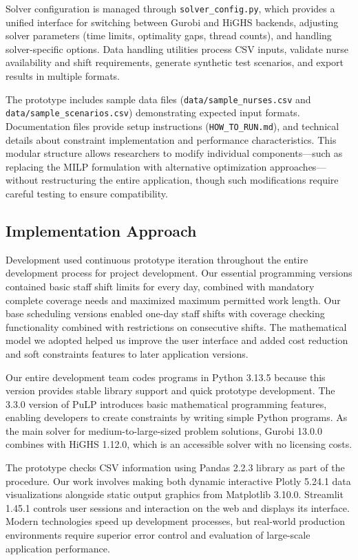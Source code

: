 \documentclass[1pt,a4paper]{article}
\begin{document}
Solver configuration is managed through \texttt{solver\_config.py}, which provides a unified interface for switching between Gurobi and HiGHS backends, adjusting solver parameters (time limits, optimality gaps, thread counts), and handling solver-specific options. Data handling utilities process CSV inputs, validate nurse availability and shift requirements, generate synthetic test scenarios, and export results in multiple formats.

The prototype includes sample data files (\texttt{data/sample\_nurses.csv} and \texttt{data/sample\_scenarios.csv}) demonstrating expected input formats. Documentation files provide setup instructions (\texttt{HOW\_TO\_RUN.md}), and technical details about constraint implementation and performance characteristics. This modular structure allows researchers to modify individual components—such as replacing the MILP formulation with alternative optimization approaches—without restructuring the entire application, though such modifications require careful testing to ensure compatibility.

\subsection{Implementation Approach}

Development used continuous prototype iteration throughout the entire development process for project development. Our essential programming versions contained basic staff shift limits for every day, combined with mandatory complete coverage needs and maximized maximum permitted work length. Our base scheduling versions enabled one-day staff shifts with coverage checking functionality combined with restrictions on  consecutive shifts. The mathematical model we adopted helped us improve the user interface and added cost reduction and soft constraints features to later application versions.

Our entire development team codes programs in Python 3.13.5 because this version provides stable library support and quick prototype development. The 3.3.0 version of PuLP introduces basic mathematical programming features, enabling developers to create constraints by writing simple Python programs. As the main solver for medium-to-large-sized problem solutions, Gurobi 13.0.0 combines with HiGHS 1.12.0, which is an accessible solver with no licensing costs.

The prototype checks CSV information using Pandas 2.2.3 library as part of the procedure. Our work involves making both dynamic interactive Plotly 5.24.1 data visualizations alongside static output graphics from Matplotlib 3.10.0. Streamlit 1.45.1 controls user sessions and interaction on the web and displays its interface. Modern technologies speed up development processes, but real-world production environments require superior error control and evaluation of large-scale application performance.
\end{document}
